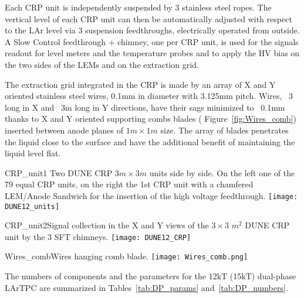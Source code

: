 Each CRP unit is independently suspended  by 3 stainless steel ropes. The  vertical level of each CRP unit can then be automatically adjusted with respect to the LAr level via 3 suspension feedthroughs, electrically operated from outside. A Slow Control feedthrough + chimney, one per CRP unit, is used for the signals readout for level meters and the temperature probes and to apply the HV bias on the two sides of the LEMs  and on the extraction grid.

The extraction grid integrated in the CRP  is made by an array of X and Y oriented stainless steel wires, 0.1mm in diameter with 3.125mm pitch.  Wires, ~3 long in X and ~3m long in Y directions, have their sags minimized to ~0.1mm thanks to X and Y oriented supporting combs blades ( Figure~\ref{fig:Wires_comb}) inserted between anode planes of $1m \times 1m$ size. The array of blades penetrates the liquid close to the surface and have the additional benefit of maintaining the liquid level flat.

\begin{cdrfigure}{CRP_unit1}{ Two DUNE CRP $3m\times 3m$ units side by side. On the left one of the 79 equal CRP units, on the right the 1st CRP unit with a chamfered LEM/Anode Sandwich for the insertion of the high voltage feedthrough.}
\texttt{[image: DUNE12\_units]}
\end{cdrfigure}

\begin{cdrfigure}{CRP_unit2}{Signal collection in the X and Y views of the  $3\times3$ $m^2$ DUNE CRP unit by the 3 SFT chimneys.}
\texttt{[image: DUNE12\_CRP]}
\end{cdrfigure}

\begin{cdrfigure}{Wires_comb}{Wires hanging comb blade.}
\texttt{[image: Wires\_comb.png]}
\end{cdrfigure}

The numbers of components and the parameters for the 12kT (15kT) dual-phase  LArTPC are summarized in Tables~\ref{tab:DP_params} and~\ref{tab:DP_numbers}.

